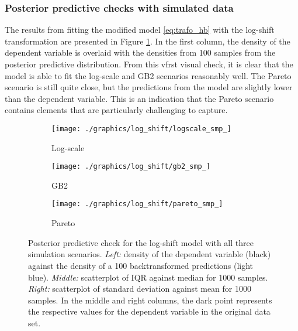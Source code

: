 \subsubsection{Posterior predictive checks with simulated data}
The results from fitting the modified model \ref{eq:trafo_hb} with the log-shift transformation are presented in Figure \ref{fig:ppc_logshift}.
In the first column, the density of the dependent variable is overlaid with the densities from 100 samples from the posterior predictive distribution.
From this vfrst visual check, it is clear that the model is able to fit the log-scale and GB2 scenarios reasonably well.
The Pareto scenario is still quite close, but the predictions from the model are slightly lower than the dependent variable.
This is an indication that the Pareto scenario contains elements that are particularly challenging to capture.


\begin{figure}
    \begin{subfigure}{\textwidth}
        \texttt{[image: ./graphics/log\_shift/logscale\_smp\_]}
        \caption{Log-scale}
    \end{subfigure}
    \newline
    \begin{subfigure}{\textwidth}
        \texttt{[image: ./graphics/log\_shift/gb2\_smp\_]}
        \caption{GB2}
    \end{subfigure}
    \newline
    \begin{subfigure}{\textwidth}
        \texttt{[image: ./graphics/log\_shift/pareto\_smp\_]}
        \caption{Pareto}
    \end{subfigure}
    \caption[Posterior predictive check for the log-shift model with all three simulation scenarios.]{Posterior predictive check for the log-shift model with all three simulation scenarios. \textit{Left:} density of the dependent variable (black) against the  density of a 100 backtransformed predictions (light blue). \textit{Middle:} scatterplot of IQR against median for 1000 samples. \textit{Right:} scatterplot of standard deviation against mean for 1000 samples. In the middle and right columns, the dark point represents the respective values for the dependent variable in the original data set.}
    \label{fig:ppc_logshift}
\end{figure}


